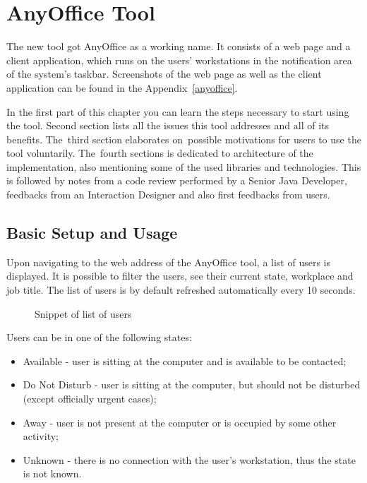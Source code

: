 \documentclass[11pt,singleside]{myfithesis2}
\newcommand{\pict}[4]{
	\begin{figure}[h!]
  		\vspace{-7px}
  		\centerline{\fcolorbox{darkgray}{palegray}{\texttt{[image: \#2]}}}
  		\caption{#1}
  		\label{#4}
	\end{figure}
}
\begin{document}
\chapter{AnyOffice Tool}

The new tool got AnyOffice as a working name. It consists of a web page and a client application, which runs on the users' workstations in the notification area of the system's taskbar. Screenshots of the web page as well as the client application can be found in the Appendix~\ref{anyoffice}.

In the first part of this chapter you can learn the steps necessary to start using the tool. Second section lists all the issues this tool addresses and all of its benefits. The~third section elaborates on~possible motivations for users to use the tool voluntarily. The~fourth sections is dedicated to architecture of the implementation, also mentioning some of the used libraries and technologies. This is followed by notes from a code review performed by a Senior Java Developer, feedbacks from an Interaction Designer and also first feedbacks from users.


	\section{Basic Setup and Usage}
Upon navigating to the web address of the AnyOffice tool, a list of users is displayed. It is possible to filter the users, see their current state, workplace and job title. The list of users is by default refreshed automatically every 10 seconds.

\vspace{15pt}
\pict{Snippet of list of users}{data/usersSnip.png}{width=\textwidth}{pic:usersSnip}
\vspace{15pt}

Users can be in one of the following states:
\begin{itemize}
	\item Available - user is sitting at the computer and is available to be contacted;
	\item Do Not Disturb - user is sitting at the computer, but should not be disturbed (except officially urgent cases);
	\item Away - user is not present at the computer or is occupied by some other activity;
	\item Unknown - there is no connection with the user's workstation, thus the state is not known.
\end{itemize}
\end{document}

